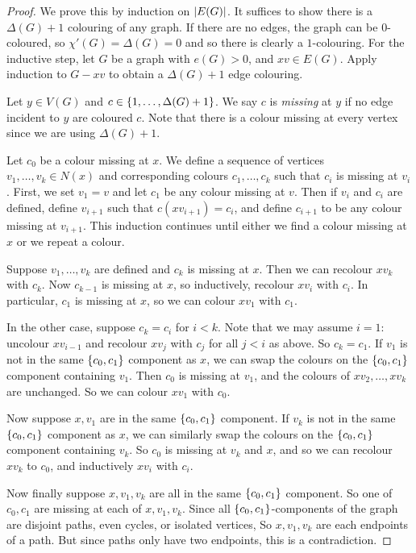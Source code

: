 \begin{proof}
	We prove this by induction on \( \abs{E(G)} \).
	It suffices to show there is a \( \Delta(G) + 1 \) colouring of any graph.
	If there are no edges, the graph can be \( 0 \)-coloured, so \( \chi'(G) = \Delta(G) = 0 \) and so there is clearly a \( 1 \)-colouring.
	For the inductive step, let \( G \) be a graph with \( e(G) > 0 \), and \( xv \in E(G) \).
	Apply induction to \( G - xv \) to obtain a \( \Delta(G) + 1 \) edge colouring.

	Let \( y \in V(G) \) and \( c \in \qty{1, \dots, \Delta(G) + 1} \).
	We say \( c \) is \emph{missing} at \( y \) if no edge incident to \( y \) are coloured \( c \).
	Note that there is a colour missing at every vertex since we are using \( \Delta(G) + 1 \).
	
	Let \( c_0 \) be a colour missing at \( x \).
	We define a sequence of vertices \( v_1, \dots, v_k \in N(x) \) and corresponding colours \( c_1, \dots, c_k \) such that \( c_i \) is missing at \( v_i \).
	First, we set \( v_1 = v \) and let \( c_1 \) be any colour missing at \( v \).
	Then if \( v_i \) and \( c_i \) are defined, define \( v_{i+1} \) such that \( c(xv_{i+1}) = c_i \), and define \( c_{i+1} \) to be any colour missing at \( v_{i+1} \).
	This induction continues until either we find a colour missing at \( x \) or we repeat a colour.

	Suppose \( v_1, \dots, v_k \) are defined and \( c_k \) is missing at \( x \).
	Then we can recolour \( xv_k \) with \( c_k \).
	Now \( c_{k-1} \) is missing at \( x \), so inductively, recolour \( xv_i \) with \( c_i \).
	In particular, \( c_1 \) is missing at \( x \), so we can colour \( xv_1 \) with \( c_1 \).

	In the other case, suppose \( c_k = c_i \) for \( i < k \).
	Note that we may assume \( i = 1 \): uncolour \( xv_{i-1} \) and recolour \( xv_j \) with \( c_j \) for all \( j < i \) as above.
	So \( c_k = c_1 \).
	If \( v_1 \) is not in the same \( \qty{c_0, c_1} \) component as \( x \), we can swap the colours on the \( \qty{c_0, c_1} \) component containing \( v_1 \).
	Then \( c_0 \) is missing at \( v_1 \), and the colours of \( xv_2, \dots, xv_k \) are unchanged.
	So we can colour \( xv_1 \) with \( c_0 \).

	Now suppose \( x, v_1 \) are in the same \( \qty{c_0, c_1} \) component.
	If \( v_k \) is not in the same \( \qty{c_0, c_1} \) component as \( x \), we can similarly swap the colours on the \( \qty{c_0, c_1} \) component containing \( v_k \).
	So \( c_0 \) is missing at \( v_k \) and \( x \), and so we can recolour \( xv_k \) to \( c_0 \), and inductively \( xv_i \) with \( c_i \).

	Now finally suppose \( x, v_1, v_k \) are all in the same \( \qty{c_0, c_1} \) component.
	So one of \( c_0, c_1 \) are missing at each of \( x, v_1, v_k \).
	Since all \( \qty{c_0, c_1} \)-components of the graph are disjoint paths, even cycles, or isolated vertices,
	So \( x, v_1, v_k \) are each endpoints of a path.
	But since paths only have two endpoints, this is a contradiction.
\end{proof}
